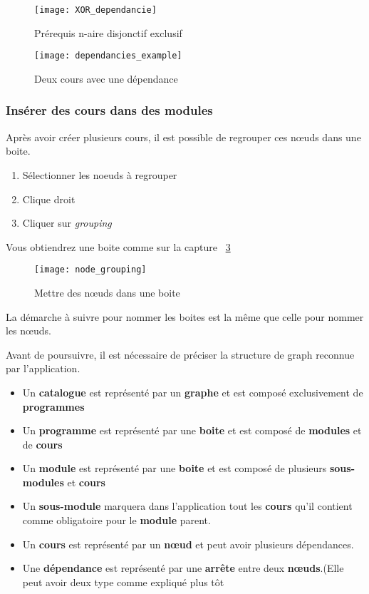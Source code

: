 \begin{figure}[htb]
\centering
\caption{Prérequis n-aire disjonctif exclusif}
\label{fig:xor_depandancy}
\texttt{[image: XOR\_dependancie]}
\end{figure}

\begin{figure}[htb]
\label{fig:dependancies_example}
\centering
\caption{Deux cours avec une dépendance}
\texttt{[image: dependancies\_example]}

\end{figure}

\subsubsection{Insérer des cours dans des modules}
Après avoir créer plusieurs cours, il est possible de regrouper ces nœuds dans une boite.
\begin{enumerate}
\item Sélectionner les noeuds à regrouper
\item Clique droit
\item Cliquer sur \textit{grouping}
\end{enumerate}

Vous obtiendrez une boite comme sur la capture ~\ref{fig:node_grouping}

\begin{figure}[htb]
\centering
\caption{Mettre des nœuds dans une boite}
\label{fig:node_grouping}
\texttt{[image: node\_grouping]}
\end{figure}

La démarche à suivre pour nommer les boites est la même que celle pour nommer les nœuds.

Avant de poursuivre, il est nécessaire de préciser la structure de graph reconnue par l'application. 

\begin{itemize}
\item Un \textbf{catalogue} est représenté par un \textbf{graphe} et est composé exclusivement de \textbf{programmes}
\item Un \textbf{programme} est représenté par une \textbf{boite} et est composé de \textbf{modules} et de \textbf{cours}
\item Un \textbf{module} est représenté par une \textbf{boite} et est composé de plusieurs \textbf{sous-modules} et \textbf{cours}
\item Un \textbf{sous-module} marquera dans l'application tout les \textbf{cours} qu'il contient comme obligatoire pour le \textbf{module} parent.
\item Un \textbf{cours} est représenté par un \textbf{nœud} et peut avoir plusieurs dépendances. 
\item Une \textbf{dépendance} est représenté par une \textbf{arrête} entre deux \textbf{nœuds}.(Elle peut avoir deux type comme expliqué plus tôt
\end{itemize}

